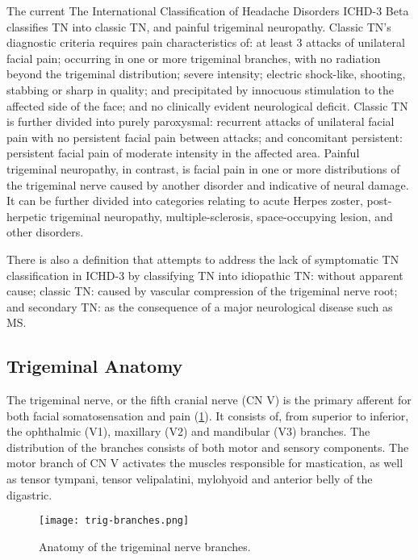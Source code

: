 The current The International Classification of Headache Disorders ICHD-3 Beta \cite{Society2013} classifies TN into classic TN, and painful trigeminal neuropathy. 
Classic TN's diagnostic criteria requires pain characteristics of: at least 3 attacks of unilateral facial pain; occurring in one or more trigeminal branches, with no radiation beyond the trigeminal distribution; severe intensity; electric shock-like, shooting, stabbing or sharp in quality; and precipitated by innocuous stimulation to the affected side of the face; and no clinically evident neurological deficit. Classic TN is further divided into purely paroxysmal: recurrent attacks of unilateral facial pain with no persistent facial pain between attacks; and concomitant persistent: persistent facial pain of moderate intensity in the affected area. 
Painful trigeminal neuropathy, in contrast, is facial pain in one or more distributions of the trigeminal nerve caused by another disorder and indicative of neural damage. It can be further divided into categories relating to acute Herpes zoster, post-herpetic trigeminal neuropathy, multiple-sclerosis, space-occupying lesion, and other disorders.

There is also a definition \cite{Zakrzewska2016} that attempts to address the lack of symptomatic TN classification in ICHD-3 by classifying TN into idiopathic TN: without apparent cause; classic TN: caused by vascular compression of the trigeminal nerve root; and secondary TN: as the consequence of a major neurological disease such as MS. 

\subsection{Trigeminal Anatomy}

The trigeminal nerve, or the fifth cranial nerve (CN V) is the primary afferent for both facial somatosensation and pain (\ref{fig:trig-branches}). It consists of, from superior to inferior, the ophthalmic (V1), maxillary (V2) and mandibular (V3) branches. The distribution of the branches consists of both motor and sensory components. The motor branch of CN V activates the muscles responsible for mastication, as well as tensor tympani, tensor velipalatini, mylohyoid and anterior belly of the digastric. 

 \begin{figure}[ht]
 \texttt{[image: trig-branches.png]}
 \centering
 \caption{Anatomy of the trigeminal nerve branches.} 
 \label{fig:trig-branches} 
 \end{figure}
 
